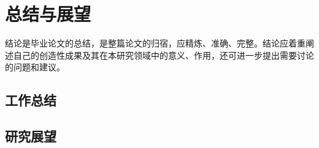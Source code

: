 \chapter{总结与展望}
结论是毕业论文的总结，是整篇论文的归宿，应精炼、准确、完整。结论应着重阐述自己的创造性成果及其在本研究领域中的意义、作用，还可进一步提出需要讨论的问题和建议。
\section{工作总结}
\section{研究展望}

\clearpage
 
